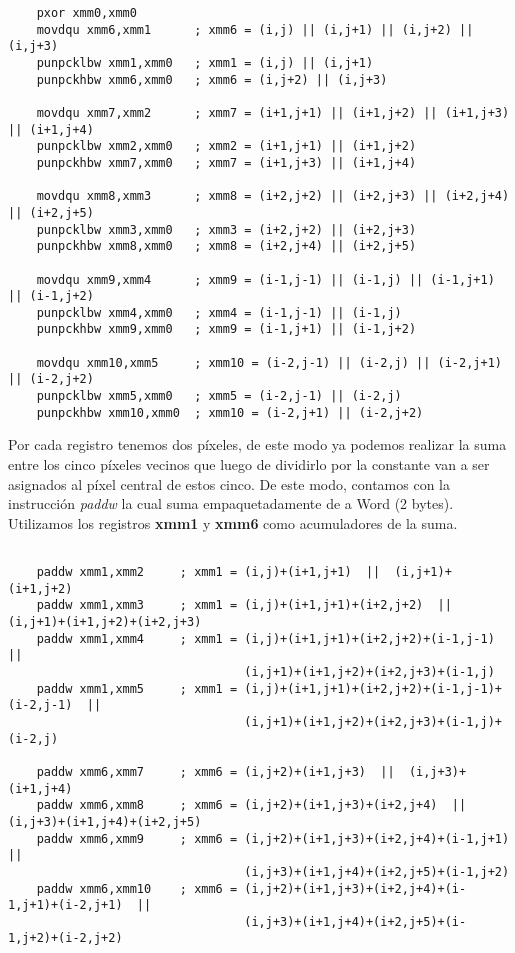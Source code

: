 \documentclass[a4paper]{article}
\begin{document}
 \begin{codesnippet}
\begin{verbatim}
    pxor xmm0,xmm0
    movdqu xmm6,xmm1      ; xmm6 = (i,j) || (i,j+1) || (i,j+2) || (i,j+3)
    punpcklbw xmm1,xmm0   ; xmm1 = (i,j) || (i,j+1)
    punpckhbw xmm6,xmm0   ; xmm6 = (i,j+2) || (i,j+3)

    movdqu xmm7,xmm2      ; xmm7 = (i+1,j+1) || (i+1,j+2) || (i+1,j+3) || (i+1,j+4)
    punpcklbw xmm2,xmm0   ; xmm2 = (i+1,j+1) || (i+1,j+2)
    punpckhbw xmm7,xmm0   ; xmm7 = (i+1,j+3) || (i+1,j+4)

    movdqu xmm8,xmm3      ; xmm8 = (i+2,j+2) || (i+2,j+3) || (i+2,j+4) || (i+2,j+5)
    punpcklbw xmm3,xmm0   ; xmm3 = (i+2,j+2) || (i+2,j+3)
    punpckhbw xmm8,xmm0   ; xmm8 = (i+2,j+4) || (i+2,j+5)

    movdqu xmm9,xmm4      ; xmm9 = (i-1,j-1) || (i-1,j) || (i-1,j+1) || (i-1,j+2)
    punpcklbw xmm4,xmm0   ; xmm4 = (i-1,j-1) || (i-1,j)
    punpckhbw xmm9,xmm0   ; xmm9 = (i-1,j+1) || (i-1,j+2)

    movdqu xmm10,xmm5     ; xmm10 = (i-2,j-1) || (i-2,j) || (i-2,j+1) || (i-2,j+2)
    punpcklbw xmm5,xmm0   ; xmm5 = (i-2,j-1) || (i-2,j)
    punpckhbw xmm10,xmm0  ; xmm10 = (i-2,j+1) || (i-2,j+2)
\end{verbatim}
\end{codesnippet}
\newpage

\indent Por cada registro tenemos dos p\'ixeles, de este modo ya podemos realizar la suma entre los cinco p\'ixeles vecinos que luego de dividirlo por la constante van a ser asignados al p\'ixel central de estos cinco. De este modo, contamos con la instrucci\'on \textit{paddw} la cual suma empaquetadamente de a Word (2 bytes). Utilizamos los registros \textbf{xmm1} y \textbf{xmm6} como acumuladores de la suma.
 \begin{codesnippet}
\begin{verbatim}

    paddw xmm1,xmm2     ; xmm1 = (i,j)+(i+1,j+1)  ||  (i,j+1)+(i+1,j+2)
    paddw xmm1,xmm3     ; xmm1 = (i,j)+(i+1,j+1)+(i+2,j+2)  ||  (i,j+1)+(i+1,j+2)+(i+2,j+3)
    paddw xmm1,xmm4     ; xmm1 = (i,j)+(i+1,j+1)+(i+2,j+2)+(i-1,j-1)  ||
                                 (i,j+1)+(i+1,j+2)+(i+2,j+3)+(i-1,j)
    paddw xmm1,xmm5     ; xmm1 = (i,j)+(i+1,j+1)+(i+2,j+2)+(i-1,j-1)+(i-2,j-1)  ||
                                 (i,j+1)+(i+1,j+2)+(i+2,j+3)+(i-1,j)+(i-2,j)

    paddw xmm6,xmm7     ; xmm6 = (i,j+2)+(i+1,j+3)  ||  (i,j+3)+(i+1,j+4)
    paddw xmm6,xmm8     ; xmm6 = (i,j+2)+(i+1,j+3)+(i+2,j+4)  ||  (i,j+3)+(i+1,j+4)+(i+2,j+5)
    paddw xmm6,xmm9     ; xmm6 = (i,j+2)+(i+1,j+3)+(i+2,j+4)+(i-1,j+1)  ||
                                 (i,j+3)+(i+1,j+4)+(i+2,j+5)+(i-1,j+2)
    paddw xmm6,xmm10    ; xmm6 = (i,j+2)+(i+1,j+3)+(i+2,j+4)+(i-1,j+1)+(i-2,j+1)  ||
                                 (i,j+3)+(i+1,j+4)+(i+2,j+5)+(i-1,j+2)+(i-2,j+2)
\end{verbatim}
\end{codesnippet}
\end{document}
